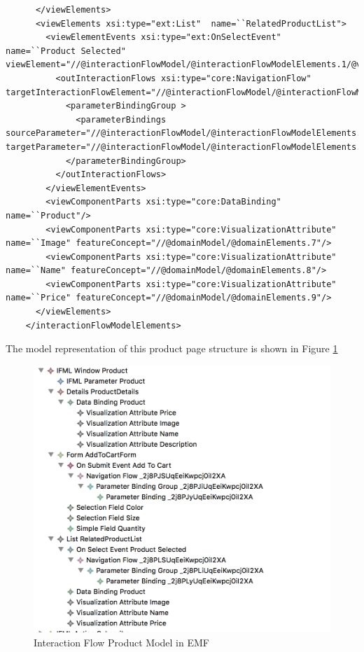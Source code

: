 \begin{lstlisting}
      </viewElements>
      <viewElements xsi:type="ext:List"  name=``RelatedProductList">
        <viewElementEvents xsi:type="ext:OnSelectEvent"  name=``Product Selected" viewElement="//@interactionFlowModel/@interactionFlowModelElements.1/@viewElements.2">
          <outInteractionFlows xsi:type="core:NavigationFlow"  targetInteractionFlowElement="//@interactionFlowModel/@interactionFlowModelElements.1">
            <parameterBindingGroup >
              <parameterBindings  sourceParameter="//@interactionFlowModel/@interactionFlowModelElements.0/@viewElements.2/@parameters.0" targetParameter="//@interactionFlowModel/@interactionFlowModelElements.1/@parameters.0"/>
            </parameterBindingGroup>
          </outInteractionFlows>
        </viewElementEvents>
        <viewComponentParts xsi:type="core:DataBinding"  name=``Product"/>
        <viewComponentParts xsi:type="core:VisualizationAttribute"  name=``Image" featureConcept="//@domainModel/@domainElements.7"/>
        <viewComponentParts xsi:type="core:VisualizationAttribute"  name=``Name" featureConcept="//@domainModel/@domainElements.8"/>
        <viewComponentParts xsi:type="core:VisualizationAttribute"  name=``Price" featureConcept="//@domainModel/@domainElements.9"/>
      </viewElements>
    </interactionFlowModelElements>
\end{lstlisting}


The model representation of this product page structure is shown in Figure \ref{fig:ifml-before-hierarchy-product}

\vspace{0.5cm}
\begin{figure}[H]
  \centering
    \includegraphics[width=13cm]{images/diagrams/before/ifml-hierarchy-product.png}
  \caption{Interaction Flow Product Model in EMF}
  \label{fig:ifml-before-hierarchy-product}
\end{figure}
\vspace{0.5cm}

